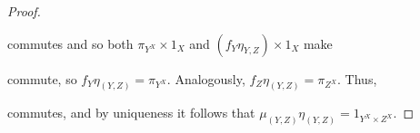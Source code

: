 \begin{solution}
\begin{exercises}
\begin{proof}
\begin{center}
            \end{center}
            commutes and so both $\pi_{Y^X}\times 1_X$ and $(f_Y\eta_{Y,Z})\times 1_X$ make
            \begin{center}
            \end{center}
            commute, so $f_Y\eta_{(Y,Z)}=\pi_{Y^X}$. Analogously, $f_Z\eta_{(Y,Z)}=\pi_{Z^X}$.
            Thus,
            \begin{center}
            \end{center}
            commutes, and by uniqueness it follows that $\mu_{(Y,Z)}\eta_{(Y,Z)}=1_{Y^X\times Z^X}$.



\end{proof}
\end{exercises}
\end{solution}
